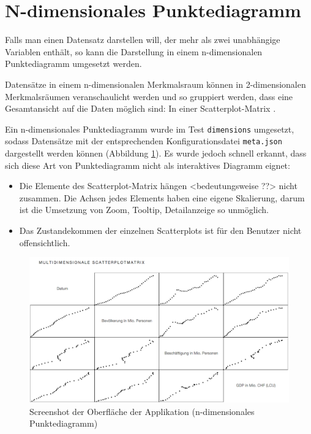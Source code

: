 \section{N-dimensionales Punktediagramm}

Falls man einen Datensatz darstellen will, der mehr als zwei unabhängige Variablen enthält, so kann die Darstellung in einem n-dimensionalen Punktediagramm umgesetzt werden.

Datensätze in einem n-dimensionalen Merkmalsraum können in 2-dimensionalen Merkmalsräumen veranschaulicht werden und so gruppiert werden, dass eine Gesamtansicht auf die Daten möglich sind: In einer Scatterplot-Matrix \cite{viz}.

Ein n-dimensionales Punktediagramm wurde im Test \texttt{dimensions} umgesetzt, sodass Datensätze mit der entsprechenden Konfigurationsdatei \texttt{meta.json} dargestellt werden können (Abbildung \ref{fig:nd}). Es wurde jedoch schnell erkannt, dass sich diese Art von Punktediagramm nicht als interaktives Diagramm eignet:

\begin{itemize}
	\item Die Elemente des Scatterplot-Matrix hängen <bedeutungsweise ??> nicht zusammen. Die Achsen jedes Elements haben eine eigene Skalierung, darum ist die Umsetzung von Zoom, Tooltip, Detailanzeige so unmöglich.
	\item Das Zustandekommen der einzelnen Scatterplots ist für den Benutzer nicht offensichtlich.
\end{itemize}

\begin{figure}[!htbp]
	\centering
	\includegraphics[width=\linewidth]{images/nd}
	\caption{Screenshot der Oberfläche der Applikation (n-dimensionales Punktediagramm)}
	\label{fig:nd}
\end{figure}
